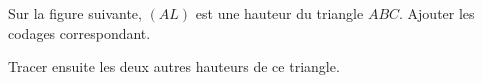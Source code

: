 
\begin{exercice}\label{exosmath-0930}

Sur la figure suivante, \( (AL)\) est une hauteur du triangle \( ABC\). Ajouter les codages correspondant.
\begin{center}

\end{center}
Tracer ensuite les deux autres hauteurs de ce triangle.

\end{exercice}
